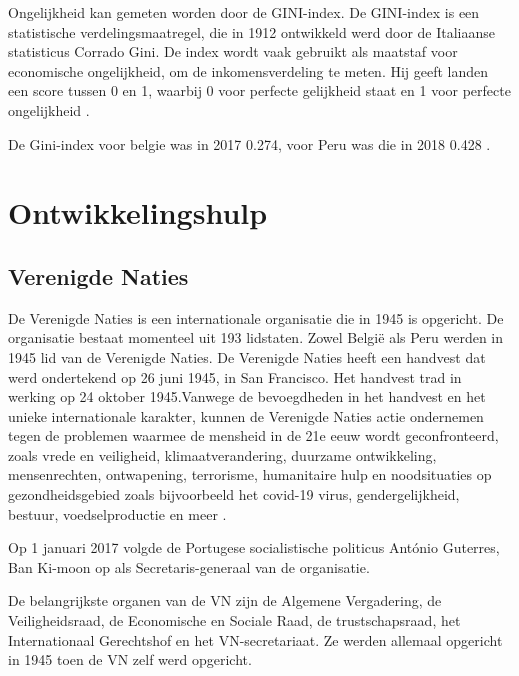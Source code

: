 Ongelijkheid kan gemeten worden door de GINI-index. De GINI-index is een statistische verdelingsmaatregel, die in 1912 ontwikkeld werd door de Italiaanse statisticus Corrado Gini. De index wordt vaak gebruikt als maatstaf voor economische ongelijkheid, om de inkomensverdeling te meten. Hij geeft landen een score tussen 0 en 1, waarbij 0 voor perfecte gelijkheid staat en 1 voor perfecte ongelijkheid \autocite{Chappelow2020}.

De Gini-index voor belgie was in 2017 0.274, voor Peru was die in 2018 0.428 \autocite{Bank2018}.


\section{Ontwikkelingshulp}

\subsection{Verenigde Naties}
De Verenigde Naties is een internationale organisatie die in 1945 is opgericht. De organisatie bestaat momenteel uit 193 lidstaten. Zowel België als Peru werden in 1945 lid van de Verenigde Naties. De Verenigde Naties heeft een handvest dat werd ondertekend op 26 juni 1945, in San Francisco. Het handvest trad in werking op 24 oktober 1945.Vanwege de bevoegdheden in het handvest en het unieke internationale karakter, kunnen de Verenigde Naties actie ondernemen tegen de problemen waarmee de mensheid in de 21e eeuw wordt geconfronteerd, zoals vrede en veiligheid, klimaatverandering, duurzame ontwikkeling, mensenrechten, ontwapening, terrorisme, humanitaire hulp en noodsituaties op gezondheidsgebied zoals bijvoorbeeld het covid-19 virus, gendergelijkheid, bestuur, voedselproductie en meer \autocite{Nations2020}.

Op 1 januari 2017 volgde de Portugese socialistische politicus António Guterres, Ban Ki-moon op als Secretaris-generaal van de organisatie. 

De belangrijkste organen van de VN zijn de Algemene Vergadering, de Veiligheidsraad, de Economische en Sociale Raad, de trustschapsraad, het Internationaal Gerechtshof en het VN-secretariaat. Ze werden allemaal opgericht in 1945 toen de VN zelf werd opgericht. 

